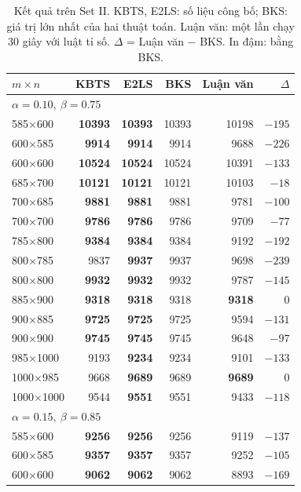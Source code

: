 \begin{table}[H]
\centering
\caption[Kết quả trên Set II]{Kết quả trên Set II. KBTS, E2LS: số liệu công bố; BKS: giá trị lớn nhất của hai thuật toán. Luận văn: một lần chạy 30 giây với luật tỉ số. $\Delta$ = Luận văn $-$ BKS. In đậm: bằng BKS.}
\label{tab:set2}
\small
\begin{tabular}{lrrrrr}
\toprule
$m\times n$ & KBTS & E2LS & BKS & Luận văn & $\Delta$\\
\midrule
\multicolumn{6}{l}{$\alpha=0.10,\ \beta=0.75$}\\
585$\times$600 & \textbf{10393} & \textbf{10393} & 10393 & 10198 & $-195$\\
600$\times$585 & \textbf{9914} & \textbf{9914} & 9914 & 9688 & $-226$\\
600$\times$600 & \textbf{10524} & \textbf{10524} & 10524 & 10391 & $-133$\\
685$\times$700 & \textbf{10121} & \textbf{10121} & 10121 & 10103 & $-18$\\
700$\times$685 & \textbf{9881} & \textbf{9881} & 9881 & 9781 & $-100$\\
700$\times$700 & \textbf{9786} & \textbf{9786} & 9786 & 9709 & $-77$\\
785$\times$800 & \textbf{9384} & \textbf{9384} & 9384 & 9192 & $-192$\\
800$\times$785 & 9837 & \textbf{9937} & 9937 & 9698 & $-239$\\
800$\times$800 & \textbf{9932} & \textbf{9932} & 9932 & 9787 & $-145$\\
885$\times$900 & \textbf{9318} & \textbf{9318} & 9318 & \textbf{9318} & 0\\
900$\times$885 & \textbf{9725} & \textbf{9725} & 9725 & 9594 & $-131$\\
900$\times$900 & \textbf{9745} & \textbf{9745} & 9745 & 9648 & $-97$\\
985$\times$1000 & 9193 & \textbf{9234} & 9234 & 9101 & $-133$\\
1000$\times$985 & 9668 & \textbf{9689} & 9689 & \textbf{9689} & 0\\
1000$\times$1000 & 9544 & \textbf{9551} & 9551 & 9433 & $-118$\\
\midrule
\multicolumn{6}{l}{$\alpha=0.15,\ \beta=0.85$}\\
585$\times$600 & \textbf{9256} & \textbf{9256} & 9256 & 9119 & $-137$\\
600$\times$585 & \textbf{9357} & \textbf{9357} & 9357 & 9252 & $-105$\\
600$\times$600 & \textbf{9062} & \textbf{9062} & 9062 & 8893 & $-169$\\

\end{tabular}
\end{table}
